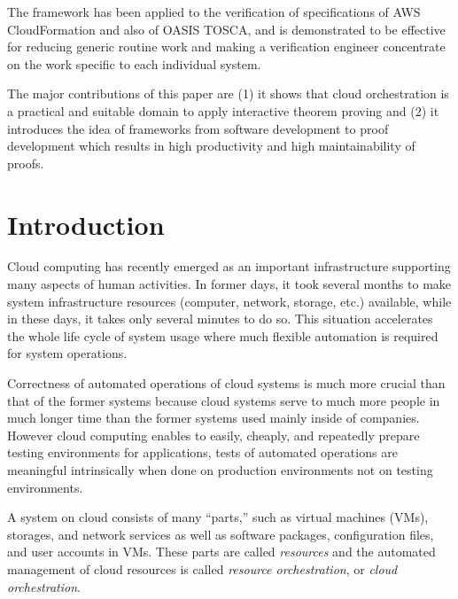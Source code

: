 \documentclass[12pt]{report}
\begin{document}
The framework has been applied to the verification of specifications
of AWS CloudFormation and also of OASIS TOSCA, and is demonstrated to
be effective for reducing generic routine work and making a
verification engineer concentrate on the work specific to each
individual system.

The major contributions of this paper are (1) it shows that cloud
orchestration is a practical and suitable domain to apply interactive
theorem proving and (2) it introduces the idea of frameworks from
software development to proof development which results in high
productivity and high maintainability of proofs.


\tableofcontents
\listoffigures
\newpage
{}
\setcounter{page}{1}

\chapter{Introduction}
Cloud computing has recently emerged as an important infrastructure
supporting many aspects of human activities. In former days, it took
several months to make system infrastructure resources (computer,
network, storage, etc.) available, while in these days, it takes only
several minutes to do so. This situation accelerates the whole life
cycle of system usage where much flexible automation is required for
system operations.

Correctness of automated operations of cloud systems is much more
crucial than that of the former systems because cloud systems serve to
much more people in much longer time than the former systems used
mainly inside of companies. However cloud computing enables to easily,
cheaply, and repeatedly prepare testing environments for applications,
tests of automated operations are meaningful intrinsically when
done on production environments not on testing environments.

A system on cloud consists of many ``parts,'' such as virtual machines
(VMs), storages, and network services as well as software packages,
configuration files, and user accounts in VMs. These parts are called
{\it resources} and the automated management of cloud resources is
called {\it resource orchestration}, or {\it cloud orchestration}.
\end{document}
